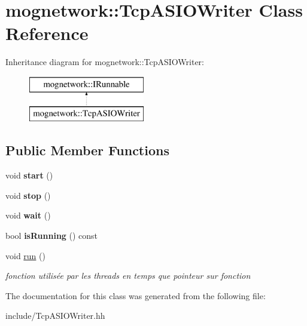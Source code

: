\hypertarget{classmognetwork_1_1_tcp_a_s_i_o_writer}{\section{mognetwork\-:\-:Tcp\-A\-S\-I\-O\-Writer Class Reference}
\label{classmognetwork_1_1_tcp_a_s_i_o_writer}
}
Inheritance diagram for mognetwork\-:\-:Tcp\-A\-S\-I\-O\-Writer\-:\begin{figure}[H]
\begin{center}
\leavevmode
\includegraphics[height=2.000000cm]{classmognetwork_1_1_tcp_a_s_i_o_writer}
\end{center}
\end{figure}
\subsection*{Public Member Functions}
\begin{DoxyCompactItemize}
\item 
\hypertarget{classmognetwork_1_1_tcp_a_s_i_o_writer_ac7adf2ec565c463b28f7b584be565863}{void {\bfseries start} ()}\label{classmognetwork_1_1_tcp_a_s_i_o_writer_ac7adf2ec565c463b28f7b584be565863}

\item 
\hypertarget{classmognetwork_1_1_tcp_a_s_i_o_writer_a72d4c74cb2fb05c23f6245de796a0928}{void {\bfseries stop} ()}\label{classmognetwork_1_1_tcp_a_s_i_o_writer_a72d4c74cb2fb05c23f6245de796a0928}

\item 
\hypertarget{classmognetwork_1_1_tcp_a_s_i_o_writer_ad3bd21b81839315d4409914f30de8652}{void {\bfseries wait} ()}\label{classmognetwork_1_1_tcp_a_s_i_o_writer_ad3bd21b81839315d4409914f30de8652}

\item 
\hypertarget{classmognetwork_1_1_tcp_a_s_i_o_writer_a0117301d2bb36f3d2b44039e16dd286d}{bool {\bfseries is\-Running} () const }\label{classmognetwork_1_1_tcp_a_s_i_o_writer_a0117301d2bb36f3d2b44039e16dd286d}

\item 
\hypertarget{classmognetwork_1_1_tcp_a_s_i_o_writer_ab3d1361bd19d8d09b278f9a361b058ea}{void \hyperlink{classmognetwork_1_1_tcp_a_s_i_o_writer_ab3d1361bd19d8d09b278f9a361b058ea}{run} ()}\label{classmognetwork_1_1_tcp_a_s_i_o_writer_ab3d1361bd19d8d09b278f9a361b058ea}

\begin{DoxyCompactList}\small\item\em fonction utilisée par les threads en temps que pointeur sur fonction \end{DoxyCompactList}\end{DoxyCompactItemize}


The documentation for this class was generated from the following file\-:\begin{DoxyCompactItemize}
\item 
include/Tcp\-A\-S\-I\-O\-Writer.\-hh\end{DoxyCompactItemize}
